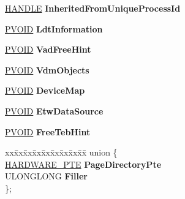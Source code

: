 \begin{DoxyCompactItemize}
\mbox{\label{struct___e_p_r_o_c_e_s_s_a6d91ca1452886f6a2b998bb424d3b99f}} 
\hyperlink{interfacevoid}{H\+A\+N\+D\+LE} {\bfseries Inherited\+From\+Unique\+Process\+Id}
\item 
\mbox{\label{struct___e_p_r_o_c_e_s_s_a825de22180da57e9dbeca43583f35bec}} 
\hyperlink{interfacevoid}{P\+V\+O\+ID} {\bfseries Ldt\+Information}
\item 
\mbox{\label{struct___e_p_r_o_c_e_s_s_a10b0115457f834048d2d2e28a3535a21}} 
\hyperlink{interfacevoid}{P\+V\+O\+ID} {\bfseries Vad\+Free\+Hint}
\item 
\mbox{\label{struct___e_p_r_o_c_e_s_s_a21a888ace51197e0e3c8a450c75f59e0}} 
\hyperlink{interfacevoid}{P\+V\+O\+ID} {\bfseries Vdm\+Objects}
\item 
\mbox{\label{struct___e_p_r_o_c_e_s_s_ae00c63aaa9845f817c6313ac717c5ec6}} 
\hyperlink{interfacevoid}{P\+V\+O\+ID} {\bfseries Device\+Map}
\item 
\mbox{\label{struct___e_p_r_o_c_e_s_s_af267b9d542689cd7115b45aacca0777b}} 
\hyperlink{interfacevoid}{P\+V\+O\+ID} {\bfseries Etw\+Data\+Source}
\item 
\mbox{\label{struct___e_p_r_o_c_e_s_s_a87ec7b8d7fcd6726b41d0e965eb84fa7}} 
\hyperlink{interfacevoid}{P\+V\+O\+ID} {\bfseries Free\+Teb\+Hint}
\item 
\mbox{\label{struct___e_p_r_o_c_e_s_s_a963aaccd5d07153f68a1a00a33c8b23f}} 
\begin{tabbing}
xx\=xx\=xx\=xx\=xx\=xx\=xx\=xx\=xx\=\kill
union \{\\
\>\hyperlink{struct___h_a_r_d_w_a_r_e___p_t_e}{HARDWARE\_PTE} {\bfseries PageDirectoryPte}\\
\>ULONGLONG {\bfseries Filler}\\
\}; \\


\end{tabbing}
\end{DoxyCompactItemize}
